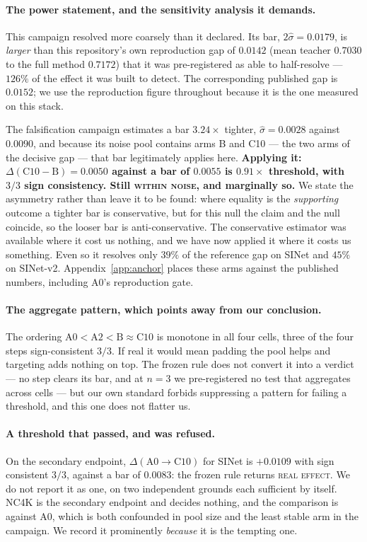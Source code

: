 \documentclass{article} %
\begin{document}
\paragraph{The power statement, and the sensitivity analysis it demands.} This campaign resolved
more coarsely than it declared. Its bar, $2\hat{\sigma} = 0.0179$, is \emph{larger} than this
repository's own reproduction gap of $0.0142$ (mean teacher $0.7030$ to the full method $0.7172$) that
it was pre-registered as able to half-resolve --- $126\%$ of the effect it was built to detect. The
corresponding published gap is $0.0152$; we use the reproduction figure throughout because it is the
one measured on this stack.

The falsification campaign estimates a bar $3.24\times$ tighter, $\hat{\sigma} = 0.0028$ against
$0.0090$, and because its noise pool contains arms B and C10 --- the two arms of the decisive gap ---
that bar legitimately applies here. \textbf{Applying it: $\Delta(\mathrm{C10}-\mathrm{B}) = 0.0050$
against a bar of $0.0055$ is $0.91\times$ threshold, with $3/3$ sign consistency. Still \textsc{within
noise}, and marginally so.} We state the asymmetry rather than leave it to be found: where equality is
the \emph{supporting} outcome a tighter bar is conservative, but for this null the claim and the null
coincide, so the looser bar is anti-conservative. The conservative estimator was available where it
cost us nothing, and we have now applied it where it costs us something. Even so it resolves only
$39\%$ of the reference gap on SINet and $45\%$ on SINet-v2. Appendix~\ref{app:anchor} places these
arms against the published numbers, including A0's reproduction gate.

\paragraph{The aggregate pattern, which points away from our conclusion.} The ordering
$\mathrm{A0}<\mathrm{A2}<\mathrm{B}\approx\mathrm{C10}$ is monotone in all four cells, three of the
four steps sign-consistent $3/3$. If real it would mean padding the pool helps and targeting adds
nothing on top. The frozen rule does not convert it into a verdict --- no step clears its bar, and at
$n=3$ we pre-registered no test that aggregates across cells --- but our own standard forbids
suppressing a pattern for failing a threshold, and this one does not flatter us.

\paragraph{A threshold that passed, and was refused.} On the secondary endpoint,
$\Delta(\mathrm{A0} \rightarrow \mathrm{C10})$ for SINet is $+0.0109$ with sign consistent $3/3$,
against a bar of $0.0083$: the frozen rule returns \textsc{real effect}. We do not report it as
one, on two independent grounds each sufficient by itself. NC4K is the secondary endpoint and decides
nothing, and the comparison is against A0, which is both confounded in pool size and the least
stable arm in the campaign. We record it prominently \emph{because} it is the tempting one.
\end{document}
